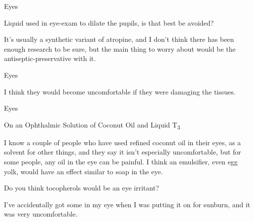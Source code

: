 \documentclass[11pt,oneside,openany,extrafontsizes]{memoir}
\begin{document}
\begin{qaexchange}{Eyes}

    \begin{question}
        Liquid used in eye-exam to dilate the pupils, is that best be avoided?
    \end{question}

    \begin{answer}
        It's usually a synthetic variant of atropine, and I don't think there has been enough research to be sure, but the main thing to worry about would be the antiseptic-preservative with it.
    \end{answer}
\end{qaexchange}

\begin{standalonequote}{Eyes}

    \begin{answer}
        I think they would become uncomfortable if they were damaging the tissues.
    \end{answer}
\end{standalonequote}

\begin{emailexchange}{Eyes}

    \begin{note}
        On an Ophthalmic Solution of Coconut Oil and Liquid T\textsubscript{3}
    \end{note}

    \begin{answer}
        I know a couple of people who have used refined coconut oil in their eyes, as a solvent for other things, and they say it isn't especially uncomfortable, but for some people, any oil in the eye can be painful. I think an emulsifier, even egg yolk, would have an effect similar to soap in the eye.
    \end{answer}

    \begin{question}
        Do you think tocopherols would be an eye irritant?
    \end{question}

    \begin{answer}
      I've accidentally got some in my eye when I was putting it on for sunburn, and it was very uncomfortable.
    \end{answer}
\end{emailexchange}
\end{document}
